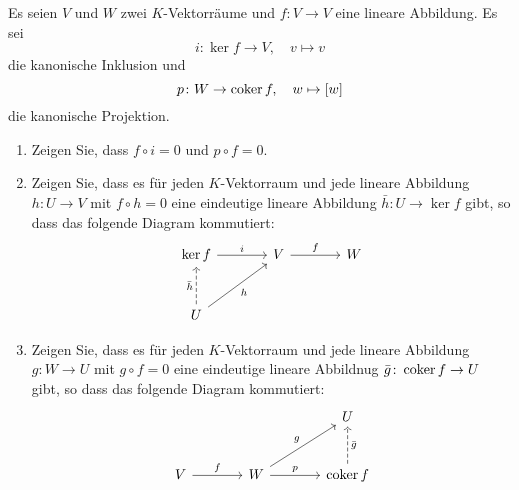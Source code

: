 \documentclass[a4paper,10pt]{scrartcl}
\begin{document}
\begin{question}
  Es seien $V$ und $W$ zwei $K$-Vektorräume und $f \colon V \to V$ eine lineare Abbildung.
  Es sei
  \[
    i \colon \ker f \to V,
    \quad
    v \mapsto v
  \]
  die kanonische Inklusion und
  \[
    p \colon W \to \operatorname{coker} f,
    \quad
    w \mapsto [w]
  \]
  die kanonische Projektion.
  \begin{enumerate}[leftmargin=*]
    \item
      Zeigen Sie, dass $f \circ i = 0$ und $p \circ f = 0$.
    \item
      Zeigen Sie, dass es für jeden $K$-Vektorraum und jede lineare Abbildung $h \colon U \to V$ mit $f \circ h = 0$ eine eindeutige lineare Abbildung $\bar{h} \colon U \to \ker f$ gibt, so dass das folgende Diagram kommutiert:
      \[
        \begin{tikzcd}[row sep = large, column sep = large, ampersand replacement = \&]
                \ker f  \arrow{r}{i}
            \&  V       \arrow{r}{f}
            \&  W
          \\
                U       \arrow[swap]{ru}{h}
                        \arrow[dashed]{u}{\bar{h}}
            \&  {}
            \&  {}
        \end{tikzcd}
      \]
    \item
      Zeigen Sie, dass es für jeden $K$-Vektorraum und jede lineare Abbildung $g \colon W \to U$ mit $g \circ f = 0$ eine eindeutige lineare Abbildnug $\bar{g} \colon \operatorname{coker} f \to U$ gibt, so dass das folgende Diagram kommutiert:
      \[
        \begin{tikzcd}[row sep = large, column sep = large, ampersand replacement = \&]
                {}
            \&  {}
            \&  U
          \\
                V         \arrow{r}{f}
            \&  W         \arrow{r}{p}
                          \arrow{ru}{g}
            \&  \coker f  \arrow[swap, dashed]{u}{\bar{g}}
        \end{tikzcd}
      \]
  \end{enumerate}
\end{question}
\end{document}
